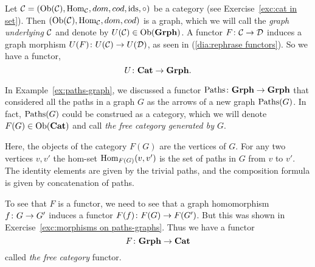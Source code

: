 \documentclass[CT4S-EN-RU]{subfiles}
\begin{document}
\begin{proofRUS}
\end{proofRUS}

\begin{exampleENG}\label{ex:underlying graph}
Let $\mathcal{C}=(\textnormal{Ob}(\mathcal{C}),\textnormal{Hom}_\mathcal{C},dom,cod,\textnormal{ids},\circ)$ be a category (see Exercise~\ref{exc:cat in set}). Then $(\textnormal{Ob}(\mathcal{C}),\textnormal{Hom}_\mathcal{C},dom,cod)$ is a graph, which we will call the {\em graph underlying $\mathcal{C}$} and denote by $U(\mathcal{C})\in\textnormal{Ob}({\mathbf{Grph}})$. A functor $F\colon\mathcal{C}\rightarrow\mathcal{D}$ induces a graph morphism $U(F)\colon U(\mathcal{C})\rightarrow U(\mathcal{D})$, as seen in (\ref{dia:rephrase functors}). So we have a functor, $$U\colon{\mathbf{Cat}}\rightarrow{\mathbf{Grph}}.$$
\end{exampleENG}

\begin{exampleRUS}\label{ex:underlying graph}
\end{exampleRUS}

\begin{exampleENG}\label{ex:free category}
In Example~\ref{ex:paths-graph}, we discussed a functor $\textnormal{Paths}\colon{\mathbf{Grph}}\rightarrow{\mathbf{Grph}}$ that considered all the paths in a graph $G$ as the arrows of a new graph $\textnormal{Paths}(G)$. In fact, $\textnormal{Paths}(G)$ could be construed as a category, which we will denote $F(G)\in\textnormal{Ob}({\mathbf{Cat}})$ and call {\em the free category generated by $G$}. 

Here, the objects of the category $F(G)$ are the vertices of $G$. For any two vertices $v,v'$ the hom-set $\textnormal{Hom}_{F(G)}(v,v')$ is the set of paths in $G$ from $v$ to $v'$. The identity elements are given by the trivial paths, and the composition formula is given by concatenation of paths. 

To see that $F$ is a functor, we need to see that a graph homomorphism $f\colon G\rightarrow G'$ induces a functor $F(f)\colon F(G)\rightarrow F(G')$. But this was shown in Exercise~\ref{exc:morphisms on paths-graphs}. Thus we have a functor $$F\colon{\mathbf{Grph}}\rightarrow{\mathbf{Cat}}$$ called {\em the free category} functor.
\end{exampleENG}

\begin{exampleRUS}\label{ex:free category}
\end{exampleRUS}
\end{document}
